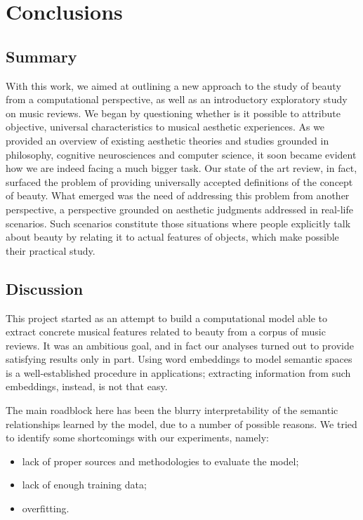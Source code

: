 \chapter{Conclusions}\label{ch:conclusion}
\section{Summary}
With this work, we aimed at outlining a new approach to the study of beauty from a computational perspective, as well as an introductory exploratory study on music reviews. We began by questioning whether is it possible to attribute objective, universal characteristics to musical aesthetic experiences. As we provided an overview of existing aesthetic theories and studies grounded in philosophy, cognitive neurosciences and computer science, it soon became evident how we are indeed facing a much bigger task. Our state of the art review, in fact, surfaced the problem of providing universally accepted definitions of the concept of beauty. What emerged was the need of addressing this problem from another perspective, a perspective grounded on aesthetic judgments addressed in real-life scenarios. Such scenarios constitute those situations where people explicitly talk about beauty by relating it to actual features of objects, which make possible their practical study.

\section{Discussion}
This project started as an attempt to build a computational model able to extract concrete musical features related to beauty from a corpus of music reviews. It was an ambitious goal, and in fact our analyses turned out to provide satisfying results only in part. Using word embeddings to model semantic spaces is a well-established procedure in  applications; extracting information from such embeddings, instead, is not that easy.

The main roadblock here has been the blurry interpretability of the semantic relationships learned by the model, due to a number of possible reasons. We tried to identify some shortcomings with our experiments, namely:
\begin{itemize}
\item lack of proper sources and methodologies to evaluate the model;
\item lack of enough training data;
\item overfitting.
\end{itemize}

